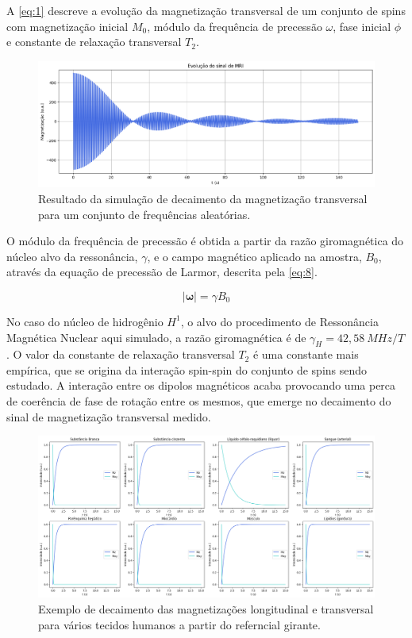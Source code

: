 \documentclass{article}
\begin{document}
A \autoref{eq:1} descreve a evolução da magnetização transversal de um conjunto de spins com magnetização inicial $M_0$, módulo da frequência de precessão $\omega$, fase inicial $\phi$ e constante 
de relaxação transversal $T_2$. 

\begin{figure} [H]
    \includegraphics[scale=0.28]{sinal_simulado.png}
    \centering
    \caption{Resultado da simulação de decaimento da magnetização transversal para um conjunto de frequências aleatórias.}
    \label{fig:3}
\end{figure}

O módulo da frequência de precessão é obtida a partir da razão giromagnética do núcleo alvo da ressonância, $\gamma$, e o campo magnético aplicado na amostra, $B_0$, através 
da equação de precessão de Larmor, descrita pela \autoref{eq:8}.

\begin{equation} \label{eq:8}
    |\mathbf{\omega}| = \gamma B_0
\end{equation}

No caso do núcleo de hidrogênio $H^1$, o alvo do procedimento de Ressonância Magnética Nuclear aqui simulado, a razão giromagnética é de $\gamma_H = 42,58 \ MHz/T$. O valor da constante de relaxação transversal $T_2$ é 
uma constante mais empírica, que se origina da interação spin-spin do conjunto de spins sendo estudado. A interação entre os dipolos magnéticos acaba provocando uma perca de coerência de fase de rotação entre os mesmos, 
que emerge no decaimento do sinal de magnetização transversal medido.

\begin{figure}[H]
    \includegraphics[scale=0.25]{T2.png}
    \centering
    \caption{Exemplo de decaimento das magnetizações longitudinal e transversal para vários tecidos humanos a partir do referncial girante.}
    \label{fig:7}
\end{figure}
\end{document}
